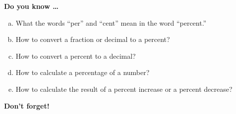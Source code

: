 \newpage



\bigskip

\noindent \textbf{Do you know \ldots}

\begin{enumerate}[(a)]
\item What the words ``per'' and ``cent'' mean in the word ``percent.'' \vfill
\item How to convert a fraction or decimal to a percent? \vfill
\item How to convert a percent to a decimal? \vfill
\item How to calculate a percentage of a number? \vfill
\item How to calculate the result of a percent increase or a percent decrease? \vfill
\end{enumerate}

\noindent \textbf{Don't forget!}
\vfill \vfill \vfill




